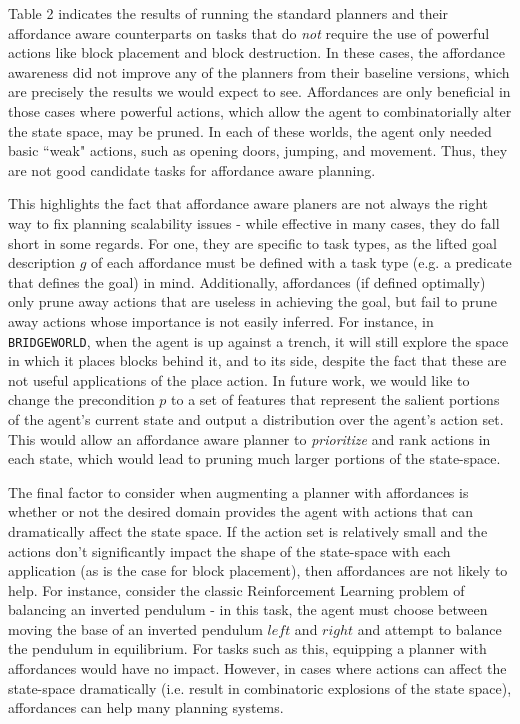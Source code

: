 \documentclass[]{article}
\begin{document}
Table 2 indicates the results of running the standard planners and their affordance aware counterparts
on tasks that do {\it not} require the use of powerful actions like block placement and block destruction.
In these cases, the affordance awareness did not improve any of the planners from their baseline versions, which are precisely the results we would expect to see. Affordances are only beneficial in those cases
where powerful actions, which allow the agent to combinatorially alter the state space, may be pruned. In each of these worlds, the agent only needed basic ``weak" actions,
such as opening doors, jumping, and movement. Thus, they are not good candidate tasks for affordance
aware planning.

This highlights the fact that affordance aware planers are not always the right way to fix planning scalability issues - while effective in many cases, they do fall short in some regards. For one, they are specific to task types, as the lifted goal description $g$ of each affordance must be defined with a task type (e.g. a predicate that defines the goal) in mind. Additionally, affordances (if defined optimally) 
only prune away actions that are useless in achieving the goal, 
but fail to prune away actions whose importance is not easily inferred. For instance,
in \texttt{BRIDGEWORLD}, when the agent is up against a trench, it will still explore the space in which it places
blocks behind it, and to its side, despite the fact that these are not useful applications of the place action. In future
work, we would like to change the precondition $p$ to a set of features that represent the salient portions of the agent's
current state and output a distribution over the agent's action set. This would allow an affordance
aware planner to {\it prioritize} and rank actions in each state, which would lead to pruning much larger portions of the state-space.


The final factor to consider when augmenting a planner with affordances is whether or not the desired domain provides
the agent with actions that can dramatically affect the state space. If the action set is relatively small and the actions
don't significantly impact the shape of the state-space with each application (as is the case for block placement), then affordances are not likely to help. For instance, consider the classic Reinforcement Learning problem of balancing an inverted pendulum - in this task, the agent must choose between moving the base of an inverted pendulum $left$ and $right$ and attempt to balance the pendulum in equilibrium. For tasks such as this, equipping a planner with affordances would have no impact. However, in cases where actions can affect the state-space dramatically (i.e. result in combinatoric explosions of the state space), affordances can help many planning systems.
\end{document}
